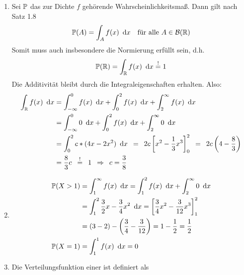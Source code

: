 \begin{exercisePage}
    \begin{enumerate}[leftmargin=*, label=(\alph*)]
        \item Sei $\P$ das zur Dichte $f$ gehörende Wahrscheinlichkeitsmaß. Dann gilt nach Satz 1.8
        \begin{equation*}
        \P(A) = \int_A f(x) \dx \quad \text{für alle } A \in \borel\R
        \end{equation*}
        Somit muss auch insbesondere die Normierung erfüllt sein, d.h.
        \begin{equation*}
        \P(\R) = \int_\R f(x) \dx \overset{!}{=} 1
        \end{equation*}
        Die Additivität bleibt durch die Integraleigenschaften erhalten. Also:
        \begin{equation*}
        \begin{aligned}
        \int_\R f(x) \dx &= \int_{-\infty}^0 f(x) \dx + \int_0^2 f(x) \dx + \int_2^\infty f(x) \dx \\
        &= \int_{-\infty}^0 0 \dx + \int_0^2 f(x) \dx + \int_2^\infty 0 \dx \\
        &= \int_0^2 c * (4x - 2x^2) \dx 
        \enskip = \enskip 2c \left[ x^2 - \frac{1}{3} x^3 \right]_0^2
        \enskip = \enskip 2c \left( 4 - \frac{8}{3} \right) \\
        &= \frac{8}{3} c \enskip \overset{!}{=} \enskip 1 
        \follows c = \frac{3}{8}
        \end{aligned}
        \end{equation*}
        \item 
        \begin{equation*}
            \begin{aligned}
            \P(X > 1) &= \int_1^\infty f(x) \dx 
            = \int_1^2 f(x) \dx + \int_2^\infty 0 \dx \\
            &= \int_1^2 \frac{3}{2} x - \frac{3}{4} x^2 \dx
            = \left[ \frac{3}{4} x^2 - \frac{3}{12} x^3 \right]_1^2 \\
            &= \left( 3-2 \right) - \left( \frac{3}{4} - \frac{3}{12} \right) 
            = 1 - \frac{1}{2} = \frac{1}{2} \\
            \P(X=1) &= \int_1^1 f(x) \dx = 0              
            \end{aligned}
        \end{equation*}
        \item Die Verteilungsfunktion einer \ZV ist definiert als 
        \begin{equation*}

\end{equation*}
\end{enumerate}
\end{exercisePage}
